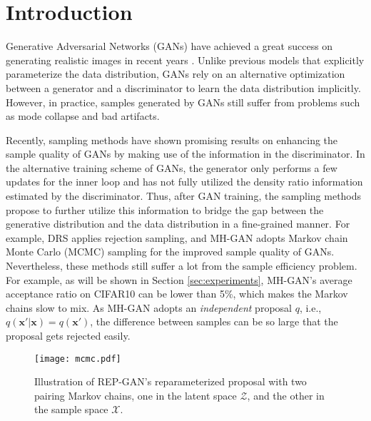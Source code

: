 \documentclass[runningheads]{llncs}
\newcommand{\bx}{\mathbf{x}}
\newcommand{\cX}{\mathcal{X}}
\newcommand{\cZ}{\mathcal{Z}}
\newcommand{\<}{\left\langle}
\renewcommand{\>}{\right\rangle}
\begin{document}
\section{Introduction}

Generative Adversarial Networks (GANs) \cite{goodfellow2014generative} have achieved a great success on generating realistic images in recent years \cite{karras2019style,brock2018large}. Unlike previous models that explicitly parameterize the data distribution, GANs rely on an alternative optimization between a generator and a discriminator to learn the data distribution implicitly. However, in practice, samples generated by GANs still suffer from problems such as mode collapse and bad artifacts. 



Recently, sampling methods have shown promising results on enhancing the sample quality of GANs by making use of 
the information in the discriminator.
In the alternative training scheme of GANs, the generator only performs a few updates for the inner loop and has not fully utilized the density ratio information estimated by the discriminator. Thus, after GAN training, the sampling methods propose to further utilize this information to bridge the gap between the generative distribution and the data distribution in a fine-grained manner.
For example, DRS \cite{azadi2019discriminator} applies rejection sampling, and MH-GAN \cite{turner2019metropolis} adopts Markov chain Monte Carlo (MCMC) sampling for the improved sample quality of GANs. Nevertheless, these methods still suffer a lot from the sample efficiency problem. For example, as will be shown in Section \ref{sec:experiments}, MH-GAN's average acceptance ratio on CIFAR10 can be lower than 5\%, which makes the Markov chains slow to mix. As MH-GAN adopts an \emph{independent} proposal $q$, i.e., $q(\bx'|\bx)=q(\bx')$, the difference between samples can be so large that the proposal gets rejected easily. 

\begin{figure}[t]
\centering
\texttt{[image: mcmc.pdf]}
\caption{Illustration of REP-GAN's reparameterized proposal with two pairing Markov chains, one in the latent space $\cZ$, and the other in the sample space $\cX$. }
\label{fig:pairing-chains}
\end{figure}
\end{document}
